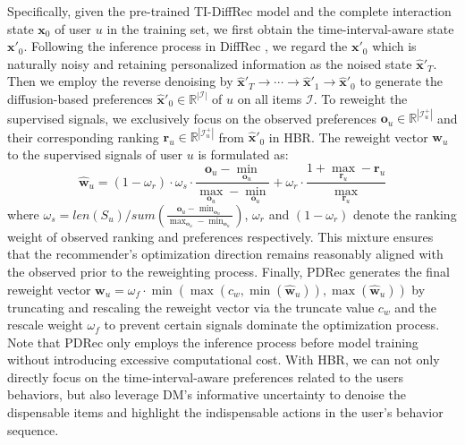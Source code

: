 \documentclass[letterpaper]{article} %
\begin{document}
Specifically, given the pre-trained TI-DiffRec model and the complete interaction state $\bm{x}_{0}$ of user $u$ in the training set, we first obtain the time-interval-aware state $\bm{x'}_{0}$.
Following the inference process in DiffRec \cite{DiffRec}, we regard the $\bm{x'}_{0}$ which is naturally noisy and retaining personalized information as the noised state $\bm{\hat{x}'}_{T}$.
Then we employ the reverse denoising by $\bm{\hat{x}'}_{T}\!\rightarrow\!\cdots\!\rightarrow\!\bm{\hat{x}'}_{1}\!\rightarrow\!\bm{\hat{x}'}_{0}$ to generate the diffusion-based preferences $\bm{\hat{x}'}_{0}\!\in\!\mathbb{R}^{|\mathcal{I}|}$ of $u$ on all items $\mathcal{I}$. To reweight the supervised signals, we exclusively focus on the observed preferences $\bm{o}_{u}\!\in\!\mathbb{R}^{|\mathcal{I}^{+}_u|}$ and their corresponding ranking $\bm{r}_{u}\!\in\!\mathbb{R}^{|\mathcal{I}^{+}_u|}$ from $\bm{\hat{x}'}_{0}$ in HBR. The reweight vector $\bm{w}_u$ to the supervised signals of user $u$ is formulated as:
\begin{equation}
    \bm{\hat{w}}_u\!=\!(1\!-\!\omega_r)\cdot\omega_s\cdot\frac{\bm{o}_{u}\!-\!\min_{\bm{o}_{u}}}{\max_{\bm{o}_{u}}\!-\!\min_{\bm{o}_{u}}}+\omega_r\!\cdot\!\frac{1\!+\!\max_{\bm{r}_{u}}\!-\!\bm{r}_{u}}{\max_{\bm{r}_{u}}}
\end{equation}
where $\omega_s\!=\!len(S_{u})\!/\!sum(\frac{\bm{o}_{u}\!-\!\min_{\bm{o}_{u}}}{\max_{\bm{o}_{u}}\!-\!\min_{\bm{o}_{u}}})$, $\omega_r$ and $(1\!-\!\omega_r)$ denote the ranking weight of observed ranking and preferences respectively. 
This mixture ensures that the recommender's optimization direction remains reasonably aligned with the observed prior to the reweighting process. Finally, PDRec generates the final reweight vector $\bm{w}_u = \omega_f\cdot\min(\max(c_w, \min(\bm{\hat{w}}_u)), \max(\bm{\hat{w}}_u))$ by truncating and rescaling the reweight vector via the truncate value $c_w$ and the rescale weight $\omega_f$ to prevent certain signals dominate the optimization process. Note that PDRec only employs the inference process before model training without introducing excessive computational cost. With HBR, we can not only directly focus on the time-interval-aware preferences related to the users behaviors, but also leverage DM's informative uncertainty to denoise the dispensable items and highlight the indispensable actions in the user's behavior sequence.
\end{document}
